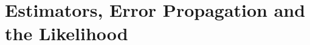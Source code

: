 \chapter{Estimators, Error Propagation and the Likelihood}\label{ch:03}

\providecommand{\ThreeAM}{}\renewcommand{\ThreeAM}{200\,000}
\providecommand{\ThreeASdMean}{}\renewcommand{\ThreeASdMean}{0.01583}
\providecommand{\ThreeASdMedian}{}\renewcommand{\ThreeASdMedian}{0.01859}
\providecommand{\ThreeASdMidrange}{}\renewcommand{\ThreeASdMidrange}{0.02155}
\providecommand{\ThreeASdFirst}{}\renewcommand{\ThreeASdFirst}{0.04993}
\providecommand{\ThreeASdTheory}{}\renewcommand{\ThreeASdTheory}{0.01581}
\providecommand{\ThreeAMedianVarRatio}{}\renewcommand{\ThreeAMedianVarRatio}{1.379}
\providecommand{\ThreeATauMean}{}\renewcommand{\ThreeATauMean}{2.198}
\providecommand{\ThreeATauSd}{}\renewcommand{\ThreeATauSd}{0.4914}
\providecommand{\ThreeATauSkew}{}\renewcommand{\ThreeATauSkew}{0.4475}
\providecommand{\ThreeATauSkewTheory}{}\renewcommand{\ThreeATauSkewTheory}{0.4472}
\providecommand{\ThreeAPiMean}{}\renewcommand{\ThreeAPiMean}{3.142}
\providecommand{\ThreeAPiSd}{}\renewcommand{\ThreeAPiSd}{0.1642}
\providecommand{\ThreeAPiSeTheory}{}\renewcommand{\ThreeAPiSeTheory}{0.1642}
\providecommand{\ThreeAUOneBias}{}\renewcommand{\ThreeAUOneBias}{2.896\times10^{-4}}
\providecommand{\ThreeAUTwoBias}{}\renewcommand{\ThreeAUTwoBias}{-0.09081}
\providecommand{\ThreeAUThreeBias}{}\renewcommand{\ThreeAUThreeBias}{1.080\times10^{-4}}
\providecommand{\ThreeAUOneMSE}{}\renewcommand{\ThreeAUOneMSE}{0.03342}
\providecommand{\ThreeAUTwoMSE}{}\renewcommand{\ThreeAUTwoMSE}{0.01517}
\providecommand{\ThreeAUThreeMSE}{}\renewcommand{\ThreeAUThreeMSE}{0.008373}
\providecommand{\ThreeAUOneMSEth}{}\renewcommand{\ThreeAUOneMSEth}{0.03333}
\providecommand{\ThreeAUTwoMSEth}{}\renewcommand{\ThreeAUTwoMSEth}{0.01515}
\providecommand{\ThreeAUThreeMSEth}{}\renewcommand{\ThreeAUThreeMSEth}{0.008333}
\providecommand{\ThreeAUTwoBiasth}{}\renewcommand{\ThreeAUTwoBiasth}{-0.09091}
\providecommand{\ThreeASlopeU}{}\renewcommand{\ThreeASlopeU}{-1.001}
\providecommand{\ThreeASlopeE}{}\renewcommand{\ThreeASlopeE}{-0.9973}
\providecommand{\ThreeASlopeP}{}\renewcommand{\ThreeASlopeP}{-1.002}
\providecommand{\ThreeACauchyIQRone}{}\renewcommand{\ThreeACauchyIQRone}{1.011}
\providecommand{\ThreeACauchyIQRlast}{}\renewcommand{\ThreeACauchyIQRlast}{0.9998}
\providecommand{\ThreeACoinExact}{}\renewcommand{\ThreeACoinExact}{0.937}
\providecommand{\ThreeACoinNclt}{}\renewcommand{\ThreeACoinNclt}{27}
\providecommand{\ThreeACoinExactNclt}{}\renewcommand{\ThreeACoinExactNclt}{0.7522}
